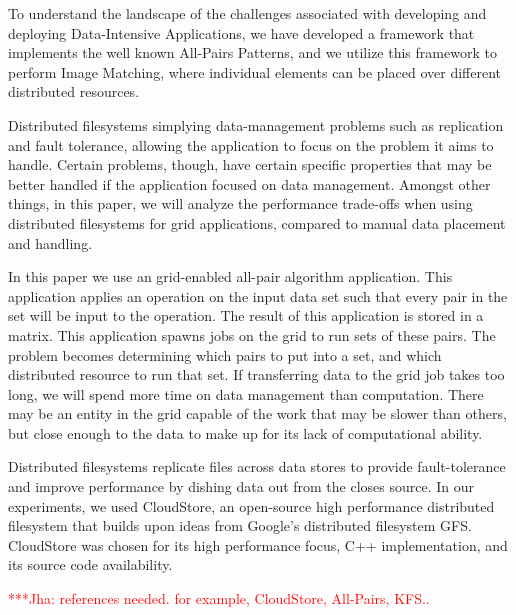 \documentclass[a4paper,11pt]{article}
\newcommand{\jhanote}[1]{ {\textcolor{red} { ***Jha: #1 }}}
\newcommand{\jhanote}[1]{}
\begin{document}
To understand the landscape of the challenges associated with developing and deploying Data-Intensive Applications, we have developed a framework that implements the well known All-Pairs Patterns, and we utilize this framework to perform Image Matching, where individual elements can be placed over different 
distributed resources.

Distributed filesystems %
simplying data-management problems such as replication and fault tolerance, allowing the application to focus on the problem it aims to handle. Certain problems, though, have certain specific properties that may be better handled if the application focused on data management.  Amongst other things, in this paper, we will analyze the performance trade-offs when using distributed filesystems for grid applications, compared to manual data placement and handling.

In this paper we use an grid-enabled all-pair algorithm application.  This application applies an operation on the input data set such that every pair in the set will be input to the operation.  The result of this application is stored in a matrix.  This application spawns jobs on the grid to run sets of these pairs.  The problem becomes determining which pairs to put into a set, and which distributed resource to run that set.  If transferring data to the grid job takes too long, we will spend more time on data management than computation.  There may be an entity in the grid capable of the work that may be slower than others, but close enough to the data to make up for its lack of computational ability.

Distributed filesystems replicate files across data stores to provide fault-tolerance and improve performance by dishing data out from the closes source.  In our experiments, we used CloudStore, an open-source high performance distributed filesystem that builds upon ideas from Google's distributed filesystem GFS.  CloudStore was chosen for its high performance focus, C++ implementation, and its source code availability.

\jhanote{references needed. for example, CloudStore, All-Pairs, KFS.. }
\end{document}

